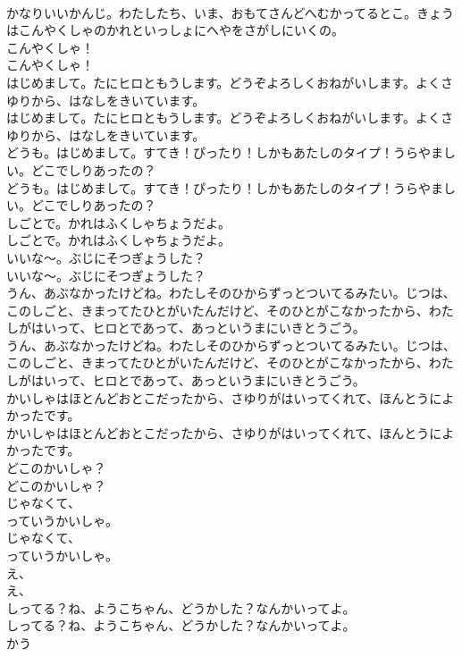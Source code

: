 \documentclass[8pt]{extreport}
\begin{document}
\begin{CJK}{UTF8}{min}
\\	かなりいいかんじ。わたしたち、いま、おもてさんどへむかってるとこ。きょうはこんやくしゃのかれといっしょにへやをさがしにいくの。 
\\	こんやくしゃ！	
\\	こんやくしゃ！ 
\\	はじめまして。たにヒロともうします。どうぞよろしくおねがいします。よくさゆりから、はなしをきいています。	
\\	はじめまして。たにヒロともうします。どうぞよろしくおねがいします。よくさゆりから、はなしをきいています。 
\\	どうも。はじめまして。すてき！ぴったり！しかもあたしのタイプ！うらやましい。どこでしりあったの？	
\\	どうも。はじめまして。すてき！ぴったり！しかもあたしのタイプ！うらやましい。どこでしりあったの？ 
\\	しごとで。かれはふくしゃちょうだよ。	
\\	しごとで。かれはふくしゃちょうだよ。 
\\	いいな〜。ぶじにそつぎょうした？	
\\	いいな〜。ぶじにそつぎょうした？ 
\\	うん、あぶなかったけどね。わたしそのひからずっとついてるみたい。じつは、このしごと、きまってたひとがいたんだけど、そのひとがこなかったから、わたしがはいって、ヒロとであって、あっというまにいきとうごう。	
\\	うん、あぶなかったけどね。わたしそのひからずっとついてるみたい。じつは、このしごと、きまってたひとがいたんだけど、そのひとがこなかったから、わたしがはいって、ヒロとであって、あっというまにいきとうごう。 
\\	かいしゃはほとんどおとこだったから、さゆりがはいってくれて、ほんとうによかったです。	
\\	かいしゃはほとんどおとこだったから、さゆりがはいってくれて、ほんとうによかったです。 
\\	どこのかいしゃ？	
\\	どこのかいしゃ？ 
\\	じゃなくて、
\\	っていうかいしゃ。	
\\	じゃなくて、
\\	っていうかいしゃ。 
\\	え、
\\	え、
\\	しってる？ね、ようこちゃん、どうかした？なんかいってよ。	
\\	しってる？ね、ようこちゃん、どうかした？なんかいってよ。 
\\	かう

\end{CJK}
\end{document}
